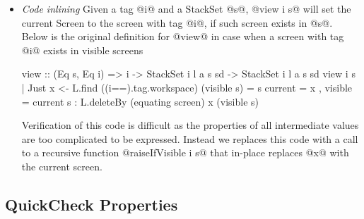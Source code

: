 \begin{itemize}
	\item\emph{Code inlining}
    Given a tag @i@ and a StackSet @s@, 
    @view i s@ will set the current Screen 
    to the screen with tag @i@, 
    if such screen exists in @s@.
    Below is the original definition for @view@
    in case when a screen with tag @i@ exists in 
    visible screens
\begin{code}
view :: (Eq s, Eq i) => i 
    -> StackSet i l a s sd -> StackSet i l a s sd
view i s    
  | Just x <- L.find ((i==).tag.workspace) 
                     (visible s)
  = s { current = x
      , visible = current s : 
          L.deleteBy (equating screen) x 
                     (visible s)} 
\end{code}
    Verification of this code is difficult
    as the properties of all intermediate values 
    are too complicated to be expressed.
    Instead we replaces this code with a call to a 
    recursive function @raiseIfVisible i s@
    that in-place replaces @x@ with the current screen.  
  
\end{itemize}

\subsection{QuickCheck Properties}

